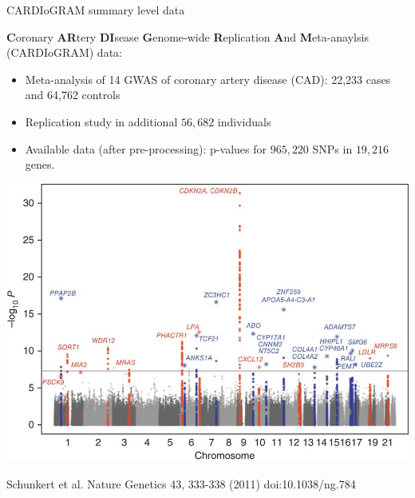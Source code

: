 \documentclass[table]{beamer}\usepackage[]{graphicx}\usepackage[]{color}
\begin{document}
\begin{frame}{CARDIoGRAM summary level data}

{\bf C}oronary {\bf AR}tery {\bf DI}sease {\bf G}enome-wide {\bf R}eplication {\bf A}nd {\bf M}eta-anaylsis (CARDIoGRAM) data:

\begin{itemize}
\item Meta-analysis of 14 GWAS of coronary artery disease (CAD): 22,233 cases and 64,762 controls
\item Replication study in additional $56,682$ individuals
\item Available data (after pre-processing): p-values for $965,220$ SNPs in $19,216$ genes.  
\end{itemize}
\end{frame}

\begin{frame}
\includegraphics[angle=0,width=1\textwidth]{ng784-F1.jpg}

\scriptsize Schunkert et al. Nature Genetics 43,  333-338 (2011) doi:10.1038/ng.784
    
\end{frame}
\end{document}
